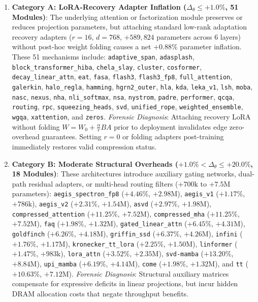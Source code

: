 \documentclass{article}
\begin{document}
\begin{enumerate}
    \item \textbf{Category A: LoRA-Recovery Adapter Inflation ($\Delta_\theta \le +1.0\%$, 51 Modules)}:
    The underlying attention or factorization module preserves or reduces projection parameters, but attaching standard low-rank adaptation recovery adapters ($r=16$, $d=768$, $+589,824$ parameters across 6 layers) without post-hoc weight folding causes a net $+0.88\%$ parameter inflation. These 51 mechanisms include:
    \texttt{adaptive\_span}, \texttt{adasplash}, \texttt{block\_transformer\_hiba}, \texttt{chela\_slay}, \texttt{cluster}, \texttt{cosformer}, \texttt{decay\_linear\_attn}, \texttt{eat}, \texttt{fasa}, \texttt{flash3}, \texttt{flash3\_fp8}, \texttt{full\_attention}, \texttt{galerkin}, \texttt{halo\_regla}, \texttt{hamming}, \texttt{hgrn2\_outer}, \texttt{hla}, \texttt{kda}, \texttt{leka\_v1}, \texttt{lsh}, \texttt{moba}, \texttt{nasc}, \texttt{nexus}, \texttt{nha}, \texttt{nli\_softmax}, \texttt{nsa}, \texttt{nystrom}, \texttt{padre}, \texttt{performer}, \texttt{qcqa}, \texttt{routing}, \texttt{rpc}, \texttt{squeezing\_heads}, \texttt{svd}, \texttt{unified\_rope}, \texttt{weighted\_ensemble}, \texttt{wgqa}, \texttt{xattention}, and \texttt{zeros}.
    \textit{Forensic Diagnosis}: Attaching recovery LoRA without folding $W = W_0 + \frac{\alpha}{r} B A$ prior to deployment invalidates edge zero-overhead guarantees. Setting $r=0$ or folding adapters post-training immediately restores valid compression status.
    
    \item \textbf{Category B: Moderate Structural Overheads ($+1.0\% < \Delta_\theta \le +20.0\%$, 18 Modules)}:
    These architectures introduce auxiliary gating networks, dual-path residual adapters, or multi-head routing filters ($+700\text{k}$ to $+7.5\text{M}$ parameters):
    \texttt{aegis\_spectron\_fp8} ($+4.46\%$, $+2.98\text{M}$), \texttt{aegis\_v1} ($+1.17\%$, $+786\text{k}$), \texttt{aegis\_v2} ($+2.31\%$, $+1.54\text{M}$), \texttt{asvd} ($+2.97\%$, $+1.98\text{M}$), \texttt{compressed\_attention} ($+11.25\%$, $+7.52\text{M}$), \texttt{compressed\_mha} ($+11.25\%$, $+7.52\text{M}$), \texttt{faq} ($+1.98\%$, $+1.32\text{M}$), \texttt{gated\_linear\_attn} ($+6.45\%$, $+4.31\text{M}$), \texttt{goldfinch} ($+6.26\%$, $+4.18\text{M}$), \texttt{griffin\_ssd} ($+6.37\%$, $+4.26\text{M}$), \texttt{infini} ($+1.76\%$, $+1.17\text{M}$), \texttt{kronecker\_tt\_lora} ($+2.25\%$, $+1.50\text{M}$), \texttt{linformer} ($+1.47\%$, $+983\text{k}$), \texttt{lora\_attn} ($+3.52\%$, $+2.35\text{M}$), \texttt{svd-mamba} ($+13.20\%$, $+8.84\text{M}$), \texttt{upi\_mamba} ($+6.19\%$, $+4.14\text{M}$), \texttt{come} ($+1.98\%$, $+1.32\text{M}$), and \texttt{tt} ($+10.63\%$, $+7.12\text{M}$).
    \textit{Forensic Diagnosis}: Structural auxiliary matrices compensate for expressive deficits in linear projections, but incur hidden DRAM allocation costs that negate throughput benefits.
    

\end{enumerate}
\end{document}
